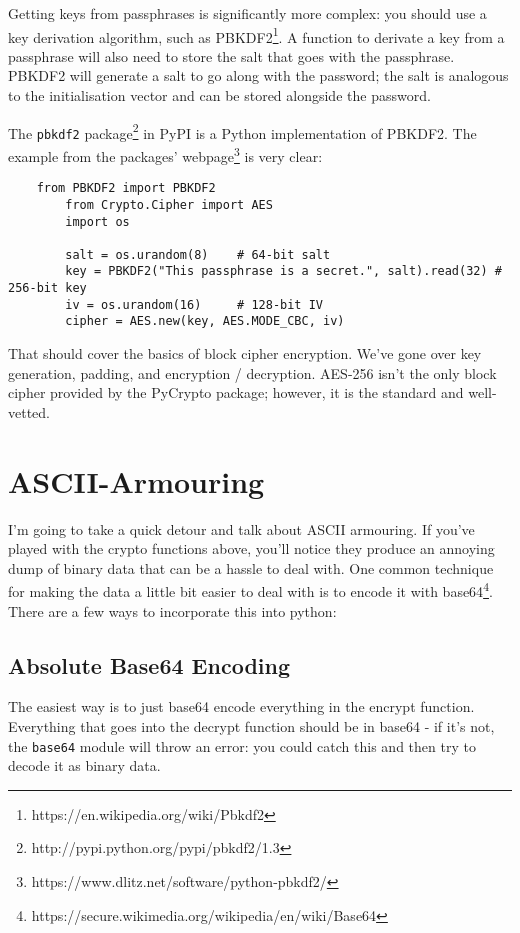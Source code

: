 \documentclass[letterpaper,10pt]{article}
\begin{document}
Getting keys from passphrases is significantly more complex: you
should use a key derivation algorithm, such as
PBKDF2\footnote{https://en.wikipedia.org/wiki/Pbkdf2}. A function to
derivate a key from a passphrase will also need to store the salt that
goes with the passphrase. PBKDF2 will generate a salt to go along with
the password; the salt is analogous to the initialisation vector and
can be stored alongside the password.

The \verb|pbkdf2| package\footnote{http://pypi.python.org/pypi/pbkdf2/1.3}
in PyPI is a Python implementation of PBKDF2. The example from the packages'
webpage\footnote{https://www.dlitz.net/software/python-pbkdf2/}
is very clear:

\begin{verbatim}
    from PBKDF2 import PBKDF2
        from Crypto.Cipher import AES
        import os
    
        salt = os.urandom(8)    # 64-bit salt
        key = PBKDF2("This passphrase is a secret.", salt).read(32) # 256-bit key
        iv = os.urandom(16)     # 128-bit IV
        cipher = AES.new(key, AES.MODE_CBC, iv)
\end{verbatim}

That should cover the basics of block cipher encryption. We've gone over key
generation, padding, and encryption / decryption. AES-256 isn't the only 
block cipher provided by the PyCrypto package; however, it is the standard
and well-vetted. 

\section{ASCII-Armouring}
I'm going to take a quick detour and talk about ASCII armouring. If you've 
played with the crypto functions above, you'll notice they produce an annoying
dump of binary data that can be a hassle to deal with. One common technique for
making the data a little bit easier to deal with is to encode it with 
base64\footnote{https://secure.wikimedia.org/wikipedia/en/wiki/Base64}. There
are a few ways to incorporate this into python:
\subsection{Absolute Base64 Encoding}
The easiest way is to just base64 encode everything in the encrypt function. 
Everything that goes into the decrypt function should be in base64 - if it's 
not, the \verb|base64| module will throw an error: you could catch this and 
then try to decode it as binary data.
\end{document}
